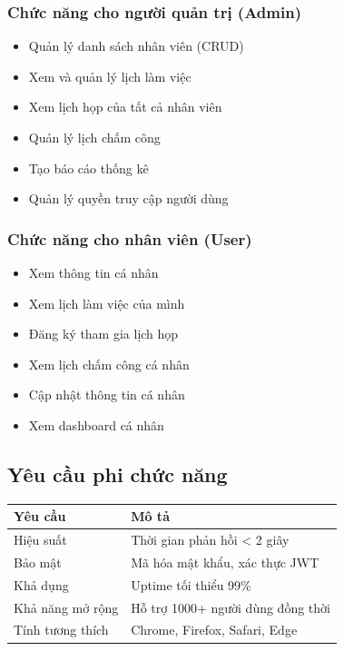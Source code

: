 \documentclass[12pt,a4paper]{report}
\begin{document}
\subsubsection{Chức năng cho người quản trị (Admin)}

\begin{itemize}
    \item Quản lý danh sách nhân viên (CRUD)
    \item Xem và quản lý lịch làm việc
    \item Xem lịch họp của tất cả nhân viên
    \item Quản lý lịch chấm công
    \item Tạo báo cáo thống kê
    \item Quản lý quyền truy cập người dùng
\end{itemize}

\subsubsection{Chức năng cho nhân viên (User)}

\begin{itemize}
    \item Xem thông tin cá nhân
    \item Xem lịch làm việc của mình
    \item Đăng ký tham gia lịch họp
    \item Xem lịch chấm công cá nhân
    \item Cập nhật thông tin cá nhân
    \item Xem dashboard cá nhân
\end{itemize}

\subsection{Yêu cầu phi chức năng}

\begin{table}[H]
    \centering
    \begin{tabular}{|l|l|}
        \hline
        \textbf{Yêu cầu} & \textbf{Mô tả} \\
        \hline
        Hiệu suất & Thời gian phản hồi < 2 giây \\
        \hline
        Bảo mật & Mã hóa mật khẩu, xác thực JWT \\
        \hline
        Khả dụng & Uptime tối thiểu 99\% \\
        \hline
        Khả năng mở rộng & Hỗ trợ 1000+ người dùng đồng thời \\
        \hline
        Tính tương thích & Chrome, Firefox, Safari, Edge \\
        \hline
    \end{tabular}
\end{table}
\end{document}
